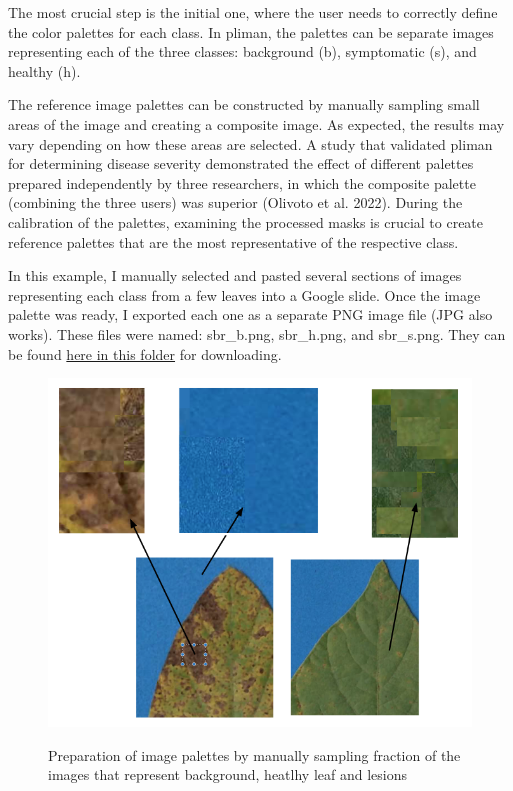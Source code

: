 \documentclass[
  letterpaper,
]{book}
\begin{document}
The most crucial step is the initial one, where the user needs to
correctly define the color palettes for each class. In pliman, the
palettes can be separate images representing each of the three classes:
background (b), symptomatic (s), and healthy (h).

The reference image palettes can be constructed by manually sampling
small areas of the image and creating a composite image. As expected,
the results may vary depending on how these areas are selected. A study
that validated pliman for determining disease severity demonstrated the
effect of different palettes prepared independently by three
researchers, in which the composite palette (combining the three users)
was superior (Olivoto et al. 2022). During the calibration of the
palettes, examining the processed masks is crucial to create reference
palettes that are the most representative of the respective class.

In this example, I manually selected and pasted several sections of
images representing each class from a few leaves into a Google slide.
Once the image palette was ready, I exported each one as a separate PNG
image file (JPG also works). These files were named: sbr\_b.png,
sbr\_h.png, and sbr\_s.png. They can be found
\href{https://github.com/emdelponte/epidemiology-R/tree/main/imgs}{here
in this folder} for downloading.

\begin{figure}

{\centering 

\href{Fig_palettes}{\includegraphics{imgs/pliman1.png}}

}

\caption{\label{fig-pliman1}Preparation of image palettes by manually
sampling fraction of the images that represent background, heatlhy leaf
and lesions}

\end{figure}
\end{document}
